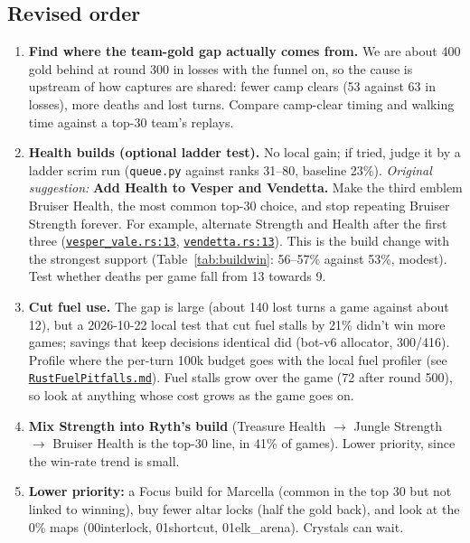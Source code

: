 \documentclass[11pt,a4paper]{article}
\newcommand{\repo}{file:///Users/tristanbasri/Desktop/Code/cambridge-battlecode-s2}
\newcommand{\code}[2]{\href{\repo/#1}{\texttt{\textcolor{cOurs!80!black}{#2}}}}
\newcommand{\veight}{bots/bot-v8/src}
\begin{document}
\subsection*{Revised order}

\begin{enumerate}
  \item \textbf{Find where the team-gold gap actually comes from.} We are about 400 gold behind at round 300 in losses with the funnel on, so the cause is upstream of how captures are shared: fewer camp clears (53 against 63 in losses), more deaths and lost turns. Compare camp-clear timing and walking time against a top-30 team's replays.
  \item \textbf{Health builds (optional ladder test).} No local gain; if tried, judge it by a ladder scrim run (\texttt{queue.py} against ranks 31--80, baseline 23\%). \emph{Original suggestion:} \textbf{Add Health to Vesper and Vendetta.} Make the third emblem Bruiser Health, the most common top-30 choice, and stop repeating Bruiser Strength forever. For example, alternate Strength and Health after the first three (\code{\veight/champions/vesper\_vale.rs}{vesper\_vale.rs:13}, \code{\veight/champions/vendetta.rs}{vendetta.rs:13}). This is the build change with the strongest support (Table~\ref{tab:buildwin}: 56--57\% against 53\%, modest). Test whether deaths per game fall from 13 towards 9.
  \item \textbf{Cut fuel use.} The gap is large (about 140 lost turns a game against about 12), but a 2026-10-22 local test that cut fuel stalls by 21\% didn't win more games; savings that keep decisions identical did (bot-v6 allocator, 300/416). Profile where the per-turn 100k budget goes with the local fuel profiler (see \code{docs/RustFuelPitfalls.md}{RustFuelPitfalls.md}). Fuel stalls grow over the game (72 after round 500), so look at anything whose cost grows as the game goes on.
  \item \textbf{Mix Strength into Ryth's build} (Treasure Health $\to$ Jungle Strength $\to$ Bruiser Health is the top-30 line, in 41\% of games). Lower priority, since the win-rate trend is small.
  \item \textbf{Lower priority:} a Focus build for Marcella (common in the top 30 but not linked to winning), buy fewer altar locks (half the gold back), and look at the 0\% maps (00interlock, 01shortcut, 01elk\_arena). Crystals can wait.
\end{enumerate}

\end{document}
